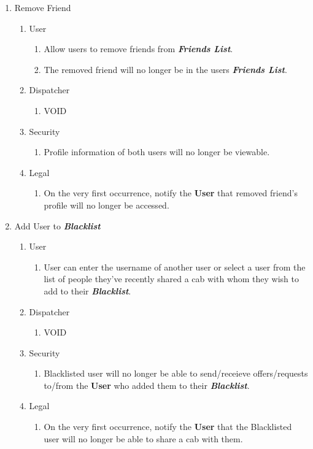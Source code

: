 \documentclass[english]{article}
\begin{document}
\begin{enumerate}[{BE}1.]
	\item Remove Friend
	\begin{enumerate}[{VP9}.1]
		\item User
			\begin{enumerate}
				\item Allow users to remove friends from \textbf{\emph{Friends List}}.
				\item The removed friend will no longer be in the users \textbf{\emph{Friends List}}.
			\end{enumerate}
		\item Dispatcher
			\begin{enumerate}
				\item VOID
			\end{enumerate}
		\item Security
			\begin{enumerate}
				\item Profile information of both users will no longer be viewable.
			\end{enumerate}
		\item Legal
			\begin{enumerate}
				\item On the very first occurrence, notify the \textbf{User} that removed friend's profile will no longer be accessed.
			\end{enumerate}
	\end{enumerate}

	\item Add User to \textbf{\emph{Blacklist}}
	\begin{enumerate}[{VP10}.1]
		\item User
			\begin{enumerate}
				\item User can enter the username of another user or select a user from the list of people they've recently shared a cab with whom they wish to add to their \textbf{\emph{Blacklist}}.
			\end{enumerate}
		\item Dispatcher
			\begin{enumerate}
				\item VOID
			\end{enumerate}
		\item Security
			\begin{enumerate}
				\item Blacklisted user will no longer be able to send/receieve offers/requests to/from the \textbf{User} who added them to their \textbf{\emph{Blacklist}}.
			\end{enumerate}
		\item Legal
			\begin{enumerate}
				\item On the very first occurrence, notify the \textbf{User} that the Blacklisted user will no longer be able to share a cab with them.
			\end{enumerate}
	\end{enumerate}


\end{enumerate}
\end{document}
